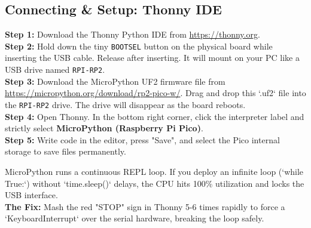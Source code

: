 \subsection{Connecting \& Setup: Thonny IDE}
\textbf{Step 1:} Download the Thonny Python IDE from \url{https://thonny.org}. \\
\textbf{Step 2:} Hold down the tiny \texttt{BOOTSEL} button on the physical board while inserting the USB cable. Release after inserting. It will mount on your PC like a USB drive named \texttt{RPI-RP2}. \\
\textbf{Step 3:} Download the MicroPython UF2 firmware file from \url{https://micropython.org/download/rp2-pico-w/}. Drag and drop this `.uf2` file into the \texttt{RPI-RP2} drive. The drive will disappear as the board reboots. \\
\textbf{Step 4:} Open Thonny. In the bottom right corner, click the interpreter label and strictly select \textbf{MicroPython (Raspberry Pi Pico)}. \\
\textbf{Step 5:} Write code in the editor, press "Save", and select the Pico internal storage to save files permanently.

\begin{troubleshootbox}
MicroPython runs a continuous REPL loop. If you deploy an infinite loop (`while True:`) without `time.sleep()` delays, the CPU hits 100\% utilization and locks the USB interface. \\
\textbf{The Fix:} Mash the red "STOP" sign in Thonny 5-6 times rapidly to force a `KeyboardInterrupt` over the serial hardware, breaking the loop safely.
\end{troubleshootbox}

